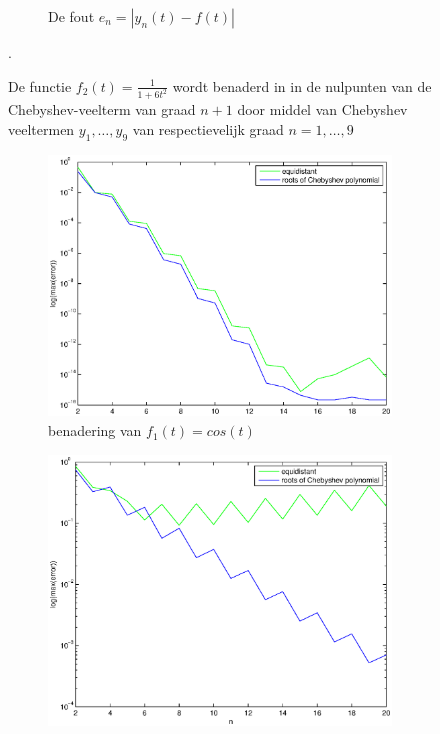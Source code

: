 \documentclass[a4paper]{article}
\begin{document}
\begin{figure}
\begin{subfigure}[t]{\textwidth}
        \caption{De fout $e_{n} = |y_{n}(t)-f(t)|$}
        \label{fig:cheb_f2_error}
    \end{subfigure}
    \hfill
    \caption{De functie $f_{2}(t) = \frac{1}{1+6t^{2}}$ wordt benaderd in in de nulpunten van de Chebyshev-veelterm van graad $n+1$ door middel van Chebyshev veeltermen $y_{1},\dots,y_{9}$ van respectievelijk graad $n=1,\dots,9$}\label{fig:cheb_f2}.
\end{figure}

\begin{figure}
    \centering
    \begin{subfigure}[t]{0.45\textwidth}
        \centering
        \includegraphics[width=\textwidth]{Jona/error_global_cos.eps}
        \caption{benadering van $f_{1}(t) = cos(t)$}
        \label{fig:error_global_cos}
    \end{subfigure}
    \begin{subfigure}[t]{0.45\textwidth}
        \centering
        \includegraphics[width=\textwidth]{Jona/error_global_f2.eps}

\end{subfigure}
\end{figure}
\end{document}
